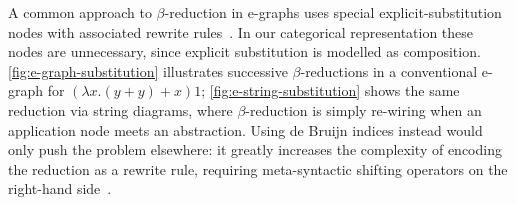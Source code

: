 A common approach to $\beta$-reduction in e-graphs uses special explicit-substitution nodes with associated rewrite rules~\cite{EggPaper,koehler2022sketchguided}.
In our categorical representation these nodes are unnecessary, since explicit substitution is modelled as composition.
\autoref{fig:e-graph-substitution} illustrates successive $\beta$-reductions in a conventional e-graph for $(\lambda x . (y + y) + x) 1$; \autoref{fig:e-string-substitution} shows the same reduction via string diagrams, where $\beta$-reduction is simply re-wiring when an application node meets an abstraction.
Using de Bruijn indices instead would only push the problem elsewhere: it greatly increases the complexity of encoding the reduction as a rewrite rule, requiring meta-syntactic shifting operators on the right-hand side~\cite{koehler2022sketchguided}.

